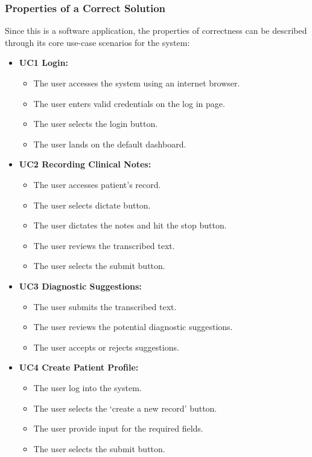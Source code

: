 \documentclass[12pt]{article}
\begin{document}
\subsubsection{Properties of a Correct Solution} \label{sec_CorrectSolution}

Since this is a software application, the properties of correctness can be described through its core use-case scenarios for the system:

\begin{itemize}
  \item\textbf{UC1 Login:}
  \begin{itemize}
    \item The user accesses the system using an internet browser.
    \item The user enters valid credentials on the log in page.
    \item The user selects the login button.
    \item The user lands on the default dashboard.
  \end{itemize}
  \item\textbf{UC2 Recording Clinical Notes:}
  \begin{itemize}
    \item The user accesses patient’s record.
    \item The user selects dictate button.
    \item The user dictates the notes and hit the stop button.
    \item The user reviews the transcribed text.
    \item The user selects the submit button.
  \end{itemize}
  \item\textbf{UC3 Diagnostic Suggestions:}
  \begin{itemize}
    \item The user submits the transcribed text.
    \item The user reviews the potential diagnostic suggestions.
    \item The user accepts or rejects suggestions.
  \end{itemize}
  \item\textbf{UC4 Create Patient Profile:}
  \begin{itemize}
    \item The user log into the system.
    \item The user selects the ‘create a new record’ button.
    \item The user provide input for the required fields.    
    \item The user selects the submit button.
  \end{itemize}
\end{itemize}
\end{document}
